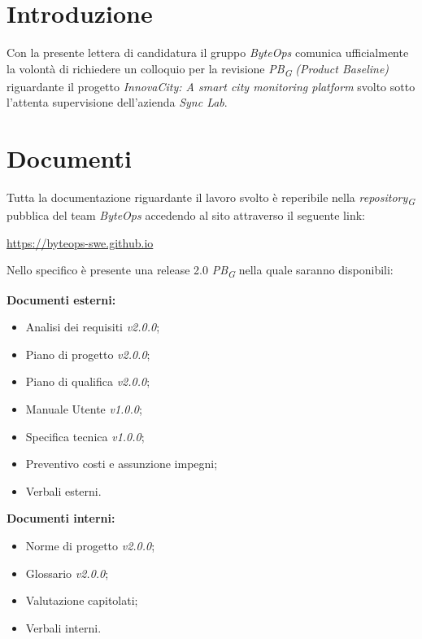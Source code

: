 \documentclass{article}
\begin{document}
\flushleft

\section{Introduzione}
Con la presente lettera di candidatura il gruppo \textit{ByteOps} comunica ufficialmente la volontà di richiedere un colloquio per la revisione \textit{PB}\textsubscript{\textit{G}} \textit{(Product Baseline)} riguardante il progetto \textit{InnovaCity: A smart city monitoring platform} svolto sotto l'attenta supervisione dell'azienda \textit{Sync Lab}.

\section{Documenti}
Tutta la documentazione riguardante il lavoro svolto è reperibile nella \textit{repository}\textsubscript{\textit{G}} pubblica del team \textit{ByteOps} accedendo al sito attraverso il seguente link:

\begin{center}
    \href{https://byteops-swe.github.io}{https://byteops-swe.github.io}
\end{center}

Nello specifico è presente una release 2.0 \textit{PB}\textsubscript{\textit{G}} nella quale saranno disponibili:
\vspace{0.2cm}

\textbf{Documenti esterni:}
\begin{itemize}
    \item Analisi dei requisiti \textit{v2.0.0};
    \item Piano di progetto \textit{v2.0.0};
    \item Piano di qualifica \textit{v2.0.0};
    \item Manuale Utente \textit{v1.0.0};
    \item Specifica tecnica \textit{v1.0.0};
    \item Preventivo costi e assunzione impegni;
    \item Verbali esterni.
\end{itemize}
\vspace{0.2cm}

\textbf{Documenti interni:}
\begin{itemize}
    \item Norme di progetto \textit{v2.0.0};
    \item Glossario \textit{v2.0.0};
    \item Valutazione capitolati;
    \item Verbali interni.
\end{itemize}
\end{document}
